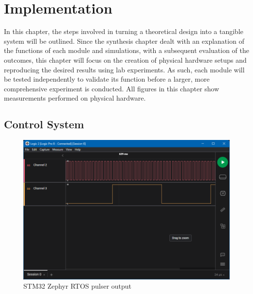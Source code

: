 \chapter{Implementation}
In this chapter, the steps involved in turning a theoretical design into a tangible system will be outlined. Since the synthesis chapter dealt with an explanation of the functions of each module and simulations, with a subsequent evaluation of the outcomes, this chapter will focus on the creation of physical hardware setups and reproducing the desired results using lab experiments. As such, each module will be tested independently to validate its function before a larger, more comprehensive experiment is conducted. All figures in this chapter show measurements performed on physical hardware.
\section{Control System}
\begin{figure}[htbp]
	\centering
	\includegraphics[width=.8\textwidth]{Figures/4_controlsystem_stm32_zephyr.png}
	\caption{STM32 Zephyr RTOS pulser output}
	\label{fig:4_stm32_zephyr_pulser}
\end{figure}
